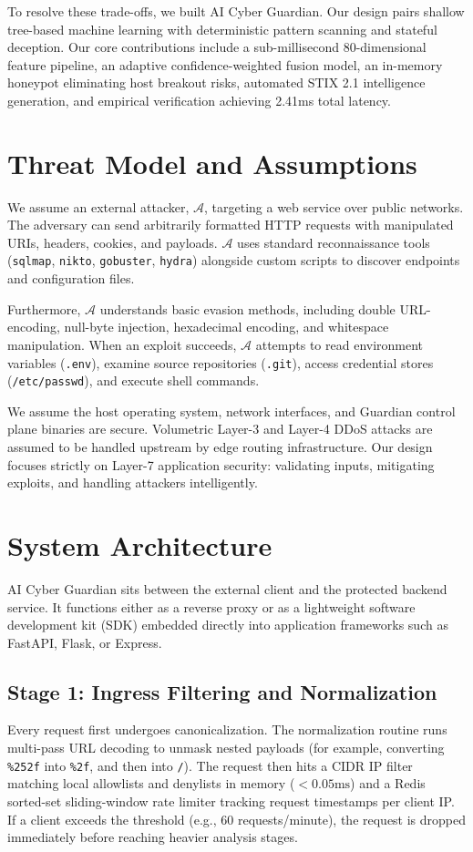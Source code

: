 \documentclass[conference]{IEEEtran}
\begin{document}
To resolve these trade-offs, we built AI Cyber Guardian. Our design pairs shallow tree-based machine learning with deterministic pattern scanning and stateful deception. Our core contributions include a sub-millisecond 80-dimensional feature pipeline, an adaptive confidence-weighted fusion model, an in-memory honeypot eliminating host breakout risks, automated STIX 2.1 intelligence generation, and empirical verification achieving 2.41ms total latency.

\section{Threat Model and Assumptions}
We assume an external attacker, $\mathcal{A}$, targeting a web service over public networks. The adversary can send arbitrarily formatted HTTP requests with manipulated URIs, headers, cookies, and payloads. $\mathcal{A}$ uses standard reconnaissance tools (\texttt{sqlmap}, \texttt{nikto}, \texttt{gobuster}, \texttt{hydra}) alongside custom scripts to discover endpoints and configuration files.

Furthermore, $\mathcal{A}$ understands basic evasion methods, including double URL-encoding, null-byte injection, hexadecimal encoding, and whitespace manipulation. When an exploit succeeds, $\mathcal{A}$ attempts to read environment variables (\texttt{.env}), examine source repositories (\texttt{.git}), access credential stores (\texttt{/etc/passwd}), and execute shell commands.

We assume the host operating system, network interfaces, and Guardian control plane binaries are secure. Volumetric Layer-3 and Layer-4 DDoS attacks are assumed to be handled upstream by edge routing infrastructure. Our design focuses strictly on Layer-7 application security: validating inputs, mitigating exploits, and handling attackers intelligently.

\section{System Architecture}
AI Cyber Guardian sits between the external client and the protected backend service. It functions either as a reverse proxy or as a lightweight software development kit (SDK) embedded directly into application frameworks such as FastAPI, Flask, or Express.

\subsection{Stage 1: Ingress Filtering and Normalization}
Every request first undergoes canonicalization. The normalization routine runs multi-pass URL decoding to unmask nested payloads (for example, converting \texttt{\%252f} into \texttt{\%2f}, and then into \texttt{/}). The request then hits a CIDR IP filter matching local allowlists and denylists in memory ($< 0.05\text{ms}$) and a Redis sorted-set sliding-window rate limiter tracking request timestamps per client IP. If a client exceeds the threshold (e.g., 60 requests/minute), the request is dropped immediately before reaching heavier analysis stages.
\end{document}
